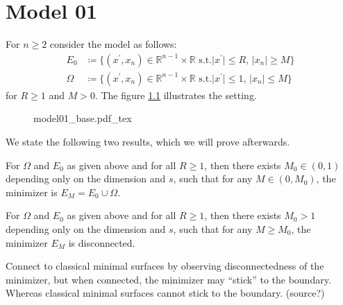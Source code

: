 \chapter{Model 01}
\label{ch:model01}

For \( n \geq 2 \) consider the model as follows:
\begin{align}
	E_0    & \coloneqq \{(x^\prime,x_n) \in \mathbb{R}^{n-1} \times \mathbb{R} \text{ s.t.} \lvert x^\prime \rvert \leq R, \, \lvert x_n \rvert \geq M \} \\
	\Omega & \coloneqq \{(x^\prime,x_n) \in \mathbb{R}^{n-1} \times \mathbb{R} \text{ s.t.} \lvert x^\prime \rvert \leq 1, \, \lvert x_n \rvert \leq M \}
\end{align}
for \( R \geq 1 \) and \( M > 0 \). The figure \cref{fig:201} illustrates the setting.

\begin{figure}[h]
	\centering
	\def\svgwidth{0.5\textwidth}
	{model01_base.pdf_tex}
	\caption{}
	\label{fig:201}
\end{figure}

We state the following two results, which we will prove afterwards.

\begin{theorem}
	\label{thm:201}
	For \( \Omega \) and \( E_0 \) as given above and for all \( R \geq 1 \), then there
	exists \( M_0 \in (0,1) \) depending only on the dimension and \( s \), such that for
	any \( M \in (0, M_0) \), the minimizer is \( E_M = E_0 \cup \Omega \).
\end{theorem}

\begin{theorem}
	\label{thm:202}
	For \( \Omega \) and \( E_0 \) as given above and for all \( R \geq 1 \), then there
	exists \( M_0 > 1 \) depending only on the dimension and \( s \), such that for any \(
	M \geq M_0 \), the minimizer \( E_M \) is disconnected.
\end{theorem}

Connect to classical minimal surfaces by observing disconnectedness of the minimizer, but
when connected, the minimizer may \enquote{stick} to the boundary. Whereas classical
minimal surfaces cannot stick to the boundary. (source?)\newline


